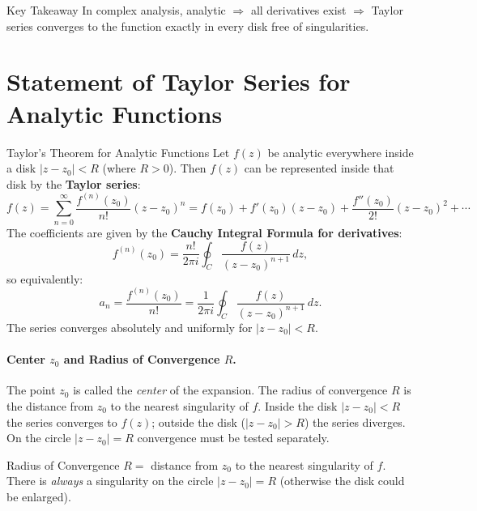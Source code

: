 \documentclass[12pt,a4paper]{article}
\begin{document}
\begin{learnbox}{Key Takeaway}
In complex analysis, analytic $\Rightarrow$ all derivatives exist $\Rightarrow$ Taylor series converges to the function exactly in every disk free of singularities.
\end{learnbox}

\section{Statement of Taylor Series for Analytic Functions}

\begin{infobox}{Taylor's Theorem for Analytic Functions}
Let $f(z)$ be analytic everywhere inside a disk $|z - z_0| < R$ (where $R > 0$). Then $f(z)$ can be represented inside that disk by the \textbf{Taylor series}:
\[
  f(z) = \sum_{n=0}^{\infty} \frac{f^{(n)}(z_0)}{n!}(z - z_0)^n
       = f(z_0) + f'(z_0)(z-z_0) + \frac{f''(z_0)}{2!}(z-z_0)^2 + \cdots
\]
The coefficients are given by the \textbf{Cauchy Integral Formula for derivatives}:
\[
  f^{(n)}(z_0) = \frac{n!}{2\pi i} \oint_{C} \frac{f(z)}{(z-z_0)^{n+1}}\,dz,
\]
so equivalently:
\[
  a_n = \frac{f^{(n)}(z_0)}{n!} = \frac{1}{2\pi i} \oint_{C} \frac{f(z)}{(z-z_0)^{n+1}}\,dz.
\]
The series converges absolutely and uniformly for $|z - z_0| < R$.
\end{infobox}

\paragraph{Center $z_0$ and Radius of Convergence $R$.}
The point $z_0$ is called the \emph{center} of the expansion. The radius of convergence $R$ is the distance from $z_0$ to the nearest singularity of $f$. Inside the disk $|z - z_0| < R$ the series converges to $f(z)$; outside the disk ($|z - z_0| > R$) the series diverges. On the circle $|z - z_0| = R$ convergence must be tested separately.

\begin{learnbox}{Radius of Convergence}
$R = $ distance from $z_0$ to the nearest singularity of $f$. There is \emph{always} a singularity on the circle $|z-z_0|=R$ (otherwise the disk could be enlarged).
\end{learnbox}

\end{document}
